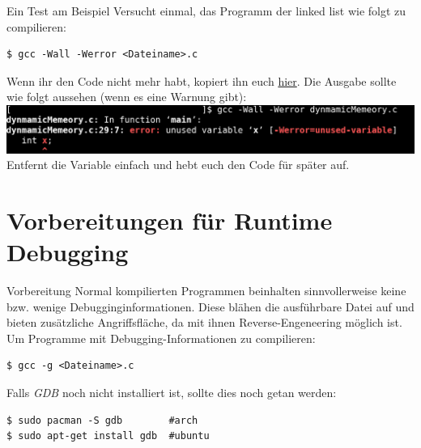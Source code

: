 \begin{frame}[fragile]{Ein Test am Beispiel}
	Versucht einmal, das Programm der linked list wie folgt zu compilieren:
		\begin{lstlisting}[numbers=none]
$ gcc -Wall -Werror <Dateiname>.c\end{lstlisting}
Wenn ihr den Code nicht mehr habt, kopiert ihn euch \href{https://github.com/scholzp/c-lessons/blob/master/materials/memory_allocation/dynmamicMemeory.c}{hier}.
Die Ausgabe sollte wie folgt aussehen (wenn es eine Warnung gibt):
\\
\bigskip
\includegraphics[width = \linewidth]{../img/gccWerror.png}
Entfernt die Variable einfach und hebt euch den Code f\"ur sp\"ater auf.
\end{frame}

\section{Vorbereitungen für Runtime Debugging}
\begin{frame}[fragile]{Vorbereitung}
	Normal kompilierten Programmen beinhalten sinnvollerweise keine bzw. wenige Debugginginformationen. Diese blähen die ausführbare Datei auf und bieten zusätzliche Angriffsfläche, da mit ihnen Reverse-Engeneering möglich ist.\\
	\bigskip
	Um Programme mit Debugging-Informationen zu compilieren:
		\begin{lstlisting}[numbers=none]
$ gcc -g <Dateiname>.c\end{lstlisting}
Falls \textit{GDB} noch nicht installiert ist, sollte dies noch getan werden:
		\begin{lstlisting}[numbers=none]
$ sudo pacman -S gdb        #arch
$ sudo apt-get install gdb  #ubuntu\end{lstlisting}

\end{frame}
